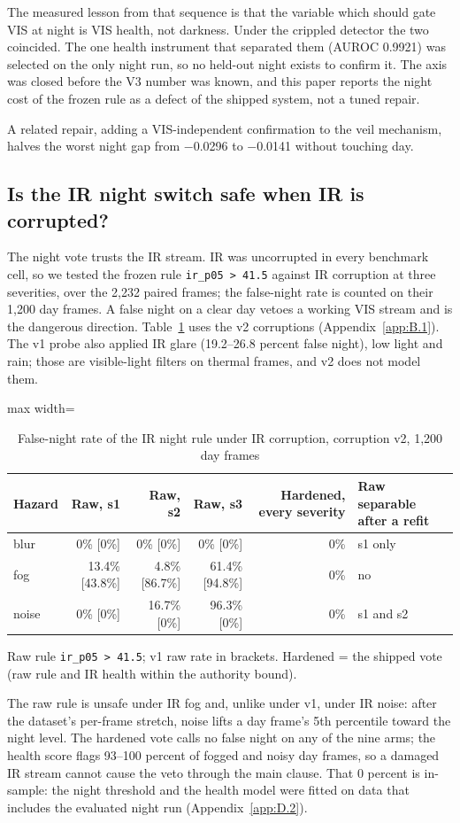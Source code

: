 \documentclass[journal,onecolumn]{IEEEtran}
\begin{document}
The measured lesson from that sequence is that the variable which should gate VIS at night is VIS health, not darkness. Under the crippled detector the two coincided. The one health instrument that separated them (AUROC 0.9921) was selected on the only night run, so no held-out night exists to confirm it. The axis was closed before the V3 number was known, and this paper reports the night cost of the frozen rule as a defect of the shipped system, not a tuned repair.

A related repair, adding a VIS-independent confirmation to the veil mechanism, halves the worst night gap from $-$0.0296 to $-$0.0141 without touching day.

\subsection{Is the IR night switch safe when IR is corrupted?}\label{app:D.5}
The night vote trusts the IR stream. IR was uncorrupted in every benchmark cell, so we tested the frozen rule \texttt{ir\_\allowbreak{}p05 > 41.5} against IR corruption at three severities, over the 2,232 paired frames; the false-night rate is counted on their 1,200 day frames. A false night on a clear day vetoes a working VIS stream and is the dangerous direction. Table~\ref{tab:8} uses the v2 corruptions (Appendix~\ref{app:B.1}). The v1 probe also applied IR glare (19.2--26.8 percent false night), low light and rain; those are visible-light filters on thermal frames, and v2 does not model them.

\begin{table}[htbp]
\centering
\footnotesize
\caption{False-night rate of the IR night rule under IR corruption, corruption v2, 1,200 day frames}
\label{tab:8}
\begin{adjustbox}{max width=\linewidth}
\begin{tabular}{lrrrrl}
\toprule
Hazard & Raw, s1 & Raw, s2 & Raw, s3 & Hardened, every severity & Raw separable after a refit \\
\midrule
blur & 0\% [0\%] & 0\% [0\%] & 0\% [0\%] & 0\% & s1 only \\
fog & 13.4\% [43.8\%] & 4.8\% [86.7\%] & 61.4\% [94.8\%] & 0\% & no \\
noise & 0\% [0\%] & 16.7\% [0\%] & 96.3\% [0\%] & 0\% & s1 and s2 \\
\bottomrule
\end{tabular}
\end{adjustbox}
\par\smallskip\raggedright\footnotesize Raw rule \texttt{ir\_\allowbreak{}p05 > 41.5}; v1 raw rate in brackets. Hardened = the shipped vote (raw rule and IR health within the authority bound).
\end{table}
The raw rule is unsafe under IR fog and, unlike under v1, under IR noise: after the dataset's per-frame stretch, noise lifts a day frame's 5th percentile toward the night level. The hardened vote calls no false night on any of the nine arms; the health score flags 93--100 percent of fogged and noisy day frames, so a damaged IR stream cannot cause the veto through the main clause. That 0 percent is in-sample: the night threshold and the health model were fitted on data that includes the evaluated night run (Appendix~\ref{app:D.2}).
\end{document}
